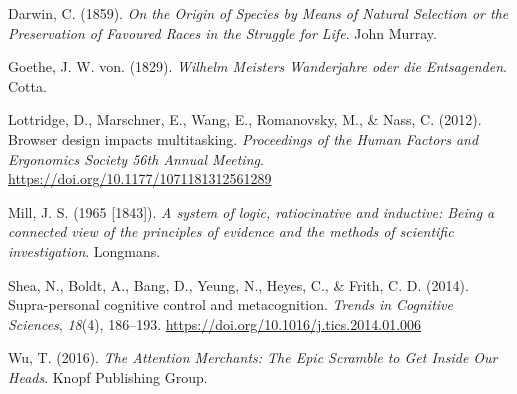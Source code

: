\documentclass[a4paper, 11pt, nobind]{templates/ociamthesis}
\newlength{\cslhangindent}
\newenvironment{CSLReferences}[2] %
 {%
  \setlength{\parindent}{0pt}
  \ifodd #1
  \let\oldpar\par
  \def\par{\hangindent=\cslhangindent\oldpar}
  \fi
  \setlength{\parskip}{1mm}
  \setlength{\baselineskip}{6mm}
 }%
 {}
\begin{document}
\hypertarget{refs}{}
\begin{CSLReferences}{1}{0}
\leavevmode{}%
Darwin, C. (1859). \emph{{On the Origin of Species by Means of Natural Selection or the Preservation of Favoured Races in the Struggle for Life}}. John Murray.

\leavevmode{}%
Goethe, J. W. von. (1829). \emph{Wilhelm {Meisters} {Wanderjahre} oder die {Entsagenden}}. Cotta.

\leavevmode{}%
Lottridge, D., Marschner, E., Wang, E., Romanovsky, M., \& Nass, C. (2012). {Browser design impacts multitasking}. \emph{Proceedings of the Human Factors and Ergonomics Society 56th Annual Meeting}. \url{https://doi.org/10.1177/1071181312561289}

\leavevmode{}%
Mill, J. S. (1965 {[}1843{]}). \emph{A system of logic, ratiocinative and inductive: Being a connected view of the principles of evidence and the methods of scientific investigation}. Longmans.

\leavevmode{}%
Shea, N., Boldt, A., Bang, D., Yeung, N., Heyes, C., \& Frith, C. D. (2014). {Supra-personal cognitive control and metacognition}. \emph{Trends in Cognitive Sciences}, \emph{18}(4), 186--193. \url{https://doi.org/10.1016/j.tics.2014.01.006}

\leavevmode{}%
Wu, T. (2016). \emph{{The Attention Merchants: The Epic Scramble to Get Inside Our Heads}}. Knopf Publishing Group.

\end{CSLReferences}

\end{document}
